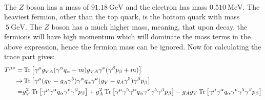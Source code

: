 \documentclass[12pt,a4]{article}
\begin{document}
\begin{enumerate}
\begin{enumerate}
\begin{align*}
        \end{align*}
        The $Z$ boson has a mass of $\SI{91.18}{\giga \eV}$ and the electron has mass $\SI{0.510}{\mega \eV}$. 
        The heaviest fermion, other than the top quark, is the bottom quark with mass $~ \SI{5}{\giga \eV}$.
        The $Z$ boson has a much higher mass, meaning, that upon decay, the fermions will have high momentum which will dominate the mass terms in the above expression, hence the fermion mass can be ignored.
        Now for calculating the trace part gives:
        \begin{align*}
          T^{\mu\nu}  =& \Tr\left[\gamma^\mu g_{VA} (\gamma^\alpha q_\alpha - m) g_{VA} \gamma^\nu (\gamma^\beta p_\beta + m) \right]\\
                   \to & \Tr\left[\gamma^\mu (g_V - g_A \gamma^5) \gamma^\alpha q_\alpha \gamma^\nu (g_V - g_A \gamma^5) \gamma^\beta p_\beta \right]\\
                      =& g_V^2 \Tr\left[\gamma^\mu  \gamma^\alpha q_\alpha \gamma^\nu \gamma^\beta p_\beta \right] + g_A^2 \Tr\left[\gamma^\mu \gamma^5 \gamma^\alpha q_\alpha \gamma^\nu \gamma^5 \gamma^\beta p_\beta \right] -  g_A g_V\Tr\left[\gamma^\mu \gamma^\alpha q_\alpha \gamma^\nu  \gamma^5 \gamma^\beta p_\beta \right]\\

\end{align*}
\end{enumerate}
\end{enumerate}
\end{document}
